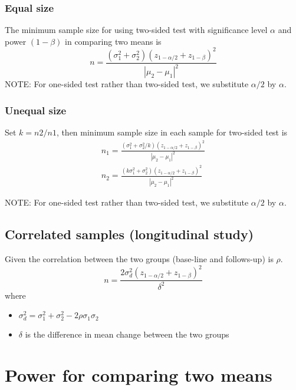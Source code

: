 \subsubsection{Equal size}
\label{sec:equal-size}


The minimum sample size for using two-sided test with significance
level $\alpha$ and power $(1-\beta)$ in comparing two means is
\begin{equation}
  \label{eq:91}
  n = \frac{(\sigma_1^2+\sigma_2^2)(z_{1-\alpha/2}+z_{1-\beta})^2}{|\mu_2-\mu_1|^2}
\end{equation}
NOTE: For one-sided test rather than two-sided test, we substitute
$\alpha/2$ by $\alpha$. 

\subsubsection{Unequal size}
\label{sec:unequal-size}

Set $k=n2/n1$, then minimum sample size in each sample for two-sided
test is
\begin{eqnarray}
  \label{eq:92}
  n_1 =
  \frac{(\sigma_1^2+\sigma_2^2/k)(z_{1-\alpha/2}+z_{1-\beta})^2}{|\mu_2-\mu_1|^2}
  \\
  n_2 = \frac{(k\sigma_1^2+\sigma_2^2)(z_{1-\alpha/2}+z_{1-\beta})^2}{|\mu_2-\mu_1|^2}
\end{eqnarray}

NOTE: For one-sided test rather than two-sided test, we substitute
$\alpha/2$ by $\alpha$. 

\subsection{Correlated samples (longitudinal study)}
\label{sec:corr-sampl-long}

Given the correlation between the two groups (base-line and
follows-up) is $\rho$.
\begin{equation}
  \label{eq:94}
  n = \frac{2\sigma_d^2(z_{1-\alpha/2} + z_{1-\beta})^2}{\delta^2}
\end{equation}
where
\begin{itemize}
\item $\sigma_d^2 = \sigma_1^2 + \sigma_2^2 - 2\rho \sigma_1\sigma_2$
\item $\delta$ is the difference in mean change between the two groups
\end{itemize}

\section{Power for comparing two means}
\label{sec:power-comparing-two}

